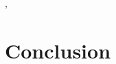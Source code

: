 \documentclass[conference, 10pt]{IEEEtran}
\begin{document}
\cite{ref:verilog-cuda}, \cite{ref:bluespec} 

\cite{ref:lynx}


\section{Conclusion}
\label{sec:conclusion}




\end{document}
